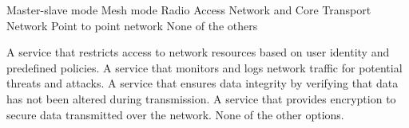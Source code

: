 \begin{checkboxes}
    \CorrectChoice Master-slave mode
    \CorrectChoice Mesh mode
    \choice Radio Access Network and Core Transport Network
    \choice Point to point network
    \choice None of the others
\end{checkboxes}

\begin{checkboxes}
    \CorrectChoice A service that restricts access to network resources based on user identity and predefined policies.
    \choice A service that monitors and logs network traffic for potential threats and attacks.
    \choice A service that ensures data integrity by verifying that data has not been altered during transmission.
    \choice A service that provides encryption to secure data transmitted over the network.
    \choice None of the other options.
\end{checkboxes}
